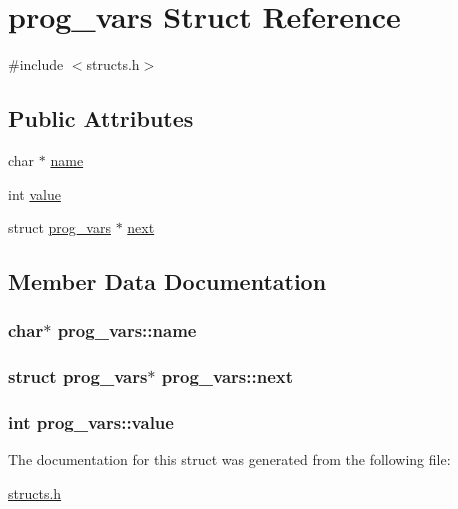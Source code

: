 \hypertarget{structprog__vars}{\section{prog\-\_\-vars Struct Reference}
\label{structprog__vars}
}


{\ttfamily \#include $<$structs.\-h$>$}

\subsection*{Public Attributes}
\begin{DoxyCompactItemize}
\item 
char $\ast$ \hyperlink{structprog__vars_a1f0c965c51ead53028547e4612168460}{name}
\item 
int \hyperlink{structprog__vars_a5c43eb3eef348c504a9cafd34eda5892}{value}
\item 
struct \hyperlink{structprog__vars}{prog\-\_\-vars} $\ast$ \hyperlink{structprog__vars_a124178c04442684131e1acbef3c0d85e}{next}
\end{DoxyCompactItemize}


\subsection{Member Data Documentation}
\hypertarget{structprog__vars_a1f0c965c51ead53028547e4612168460}{
\subsubsection[{name}]{\setlength{\rightskip}{0pt plus 5cm}char$\ast$ prog\-\_\-vars\-::name}}\label{structprog__vars_a1f0c965c51ead53028547e4612168460}
\hypertarget{structprog__vars_a124178c04442684131e1acbef3c0d85e}{
\subsubsection[{next}]{\setlength{\rightskip}{0pt plus 5cm}struct {\bf prog\-\_\-vars}$\ast$ prog\-\_\-vars\-::next}}\label{structprog__vars_a124178c04442684131e1acbef3c0d85e}
\hypertarget{structprog__vars_a5c43eb3eef348c504a9cafd34eda5892}{
\subsubsection[{value}]{\setlength{\rightskip}{0pt plus 5cm}int prog\-\_\-vars\-::value}}\label{structprog__vars_a5c43eb3eef348c504a9cafd34eda5892}


The documentation for this struct was generated from the following file\-:\begin{DoxyCompactItemize}
\item 
\hyperlink{structs_8h}{structs.\-h}\end{DoxyCompactItemize}

